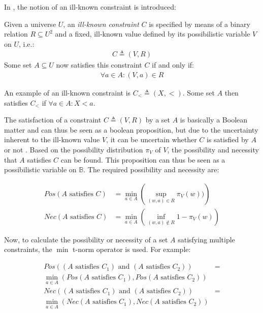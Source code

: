 In \cite{Pon11}, the notion of an ill-known constraint is introduced:

\begin{definition}
Given a universe $U$, an \emph{ill-known constraint} $C$ is specified by means of a binary relation $R \subseteq U^{2}$ and a fixed, ill-known value defined by its possibilistic variable $V$ on $U$, i.e.:
\begin{align}
C \triangleq (V,R)
\end{align}
Some set $A \subseteq U$ now satisfies this constraint $C$ if and only if:
\begin{align}
\forall a \in A : (V,a) \in R
\end{align}
\end{definition}

An example of an ill-known constraint is $C_{<} \triangleq (X, <)$. Some set $A$ then satisfies $C_{<}$ if $\forall a \in A : X <a$.

The satisfaction of a constraint $C \triangleq (V,R)$ by a set $A$ is basically a Boolean matter and can thus be seen as a boolean proposition, but due to the uncertainty inherent to the ill-known value $V$, it can be uncertain whether $C$ is satisfied by $A$ or not \cite{Pon11}. Based on the possibility distribution $\pi_{V}$ of $V$, the possibility and necessity that $A$ satisfies $C$ can be found. This proposition can thus be seen as a possibilistic variable on $\mathbb{B}$. The required possibility and necessity are:

\vspace{-10pt}

\begin{align}
Pos(A\text{ satisfies }C) & = \min_{a \in A}\left(\sup_{(w,a) \in R}\pi_{V}(w))\right) \label{eq:pos}\\
Nec(A\text{ satisfies }C) & = \min_{a \in A}\left(\inf_{(w,a) \notin R} 1-\pi_{V}(w)\right) \label{eq:nec}
\end{align}



Now, to calculate the possibility or necessity of a set $A$ satisfying multiple constraints, the $\min$ t-norm operator is used. For example:

\vspace{-10pt}

\begin{align}
Pos((A\text{ satisfies }C_{1}) \text{ and } (A\text{ satisfies }C_{2})) & = \nonumber\\
 \min_{a \in A}(Pos(A\text{ satisfies }C_{1}), Pos(A\text{ satisfies }C_{2})) \nonumber \\
Nec((A\text{ satisfies }C_{1}) \text{ and } (A\text{ satisfies }C_{2})) & = \nonumber\\
 \min_{a \in A}(Nec(A\text{ satisfies }C_{1}), Nec(A\text{ satisfies }C_{2})) \nonumber
\end{align}

